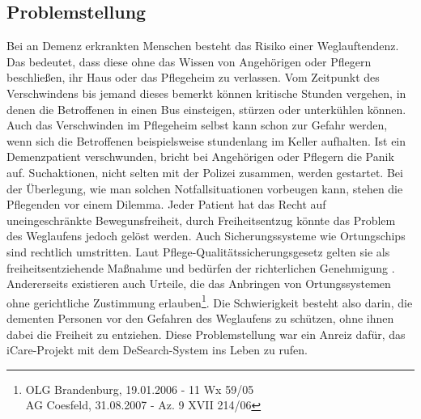 \subsection{Problemstellung}
Bei an Demenz erkrankten Menschen besteht das Risiko einer Weglauftendenz. Das bedeutet, dass diese ohne das Wissen von Angehörigen oder Pflegern beschließen, ihr Haus oder das Pflegeheim zu verlassen. Vom Zeitpunkt des Verschwindens bis jemand dieses bemerkt können kritische Stunden vergehen, in denen die Betroffenen in einen Bus einsteigen, stürzen oder unterkühlen können. Auch das Verschwinden im Pflegeheim selbst kann schon zur Gefahr werden, wenn sich die Betroffenen beispielsweise stundenlang im Keller aufhalten. Ist ein Demenzpatient verschwunden, bricht bei Angehörigen oder Pflegern die Panik auf. Suchaktionen, nicht selten mit der Polizei zusammen, werden gestartet. Bei der Überlegung, wie man solchen Notfallsituationen vorbeugen kann, stehen die Pflegenden vor einem Dilemma. Jeder Patient hat das Recht auf uneingeschränkte Bewegunsfreiheit, durch Freiheitsentzug könnte das Problem des Weglaufens jedoch gelöst werden. Auch Sicherungssysteme wie Ortungschips sind rechtlich umstritten. Laut Pflege-Qualitätssicherungsgesetz gelten sie als freiheitsentziehende Maßnahme und bedürfen der richterlichen Genehmigung \citep[Vgl.][]{pqsg}. Andererseits existieren auch Urteile, die das Anbringen von Ortungssystemen ohne gerichtliche Zustimmung erlauben\footnote{OLG Brandenburg, 19.01.2006 - 11 Wx 59/05\\AG Coesfeld, 31.08.2007 - Az. 9 XVII 214/06}. Die Schwierigkeit besteht also darin, die dementen Personen vor den Gefahren des Weglaufens zu schützen, ohne ihnen dabei die Freiheit zu entziehen. Diese Problemstellung war ein Anreiz dafür, das iCare-Projekt mit dem DeSearch-System ins Leben zu rufen.
